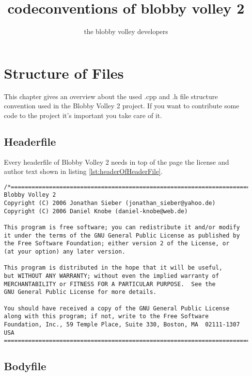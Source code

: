 \documentclass[a4paper]{scrartcl}
\title{codeconventions of blobby volley 2}
\author{the blobby volley developers}
\begin{document}
\begin{titlepage}
\maketitle
\thispagestyle{empty}
\end{titlepage}



\section{Structure of Files}
This chapter gives an overview about the used .cpp and .h file structure convention used in the Blobby Volley 2 project.
If you want to contribute some code to the project it's important you take care of it.
\subsection{Headerfile}
Every headerfile of Blobby Volley 2 needs in top of the page the license and author text shown in listing \ref{lst:headerOfHeaderFile}.
\begin{lstlisting}[caption=License and author text of a headerfile, label=lst:headerOfHeaderFile]
/*=============================================================================
Blobby Volley 2
Copyright (C) 2006 Jonathan Sieber (jonathan_sieber@yahoo.de)
Copyright (C) 2006 Daniel Knobe (daniel-knobe@web.de)

This program is free software; you can redistribute it and/or modify
it under the terms of the GNU General Public License as published by
the Free Software Foundation; either version 2 of the License, or
(at your option) any later version.

This program is distributed in the hope that it will be useful,
but WITHOUT ANY WARRANTY; without even the implied warranty of
MERCHANTABILITY or FITNESS FOR A PARTICULAR PURPOSE.  See the
GNU General Public License for more details.

You should have received a copy of the GNU General Public License
along with this program; if not, write to the Free Software
Foundation, Inc., 59 Temple Place, Suite 330, Boston, MA  02111-1307  USA
=============================================================================*/
\end{lstlisting}

\subsection{Bodyfile}
\end{document}
